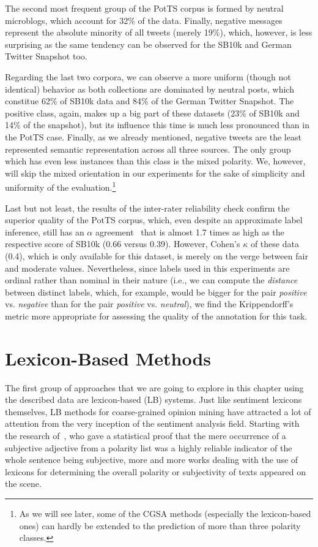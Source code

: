 The second most frequent group of the PotTS corpus is formed by
neutral microblogs, which account for 32\% of the data.  Finally,
negative messages represent the absolute minority of all tweets
(merely 19\%), which, however, is less surprising as the same tendency
can be observed for the SB10k and German Twitter Snapshot too.

Regarding the last two corpora, we can observe a more uniform (though
not identical) behavior as both collections are dominated by neutral
posts, which constitue 62\% of SB10k data and 84\% of the German
Twitter Snapshot.  The positive class, again, makes up a big part of
these datasets (23\% of SB10k and 14\% of the snapshot), but its
influence this time is much less pronounced than in the PotTS case.
Finally, as we already mentioned, negative tweets are the least
represented semantic representation across all three sources.  The
only group which has even less instances than this class is the mixed
polarity.  We, however, will skip the mixed orientation in our
experiments for the sake of simplicity and uniformity of the
evaluation.\footnote{As we will see later, some of the CGSA methods
  (especially the lexicon-based ones) can hardly be extended to the
  prediction of more than three polarity classes.}

Last but not least, the results of the inter-rater reliability check
confirm the superior quality of the PotTS corpus, which, even despite
an approximate label inference, still has an $\alpha$
agreement~\cite{Krippendorff:07} that is almost 1.7 times as high as
the respective score of SB10k (0.66 versus 0.39).  However, Cohen's
$\kappa$ of these data (0.4), which is only available for this
dataset, is merely on the verge between fair and moderate values.
Nevertheless, since labels used in this experiments are ordinal rather
than nominal in their nature (i.e., we can compute the \emph{distance}
between distinct labels, which, for example, would be bigger for the
pair \emph{positive} vs. \emph{negative} than for the pair
\emph{positive} vs. \emph{neutral}), we find the Krippendorff's metric
more appropriate for assessing the quality of the annotation for this
task.

\section{Lexicon-Based Methods}\label{sec:cgsa:lexicon-based}

The first group of approaches that we are going to explore in this
chapter using the described data are lexicon-based (LB) systems.  Just
like sentiment lexicons themselves, LB methods for coarse-grained
opinion mining have attracted a lot of attention from the very
inception of the sentiment analysis field.  Starting with the research
of~\citet{Hatzivassi:00}, who gave a statistical proof that the mere
occurrence of a subjective adjective from a polarity list was a highly
reliable indicator of the whole sentence being subjective, more and
more works dealing with the use of lexicons for determining the
overall polarity or subjectivity of texts appeared on the scene.


